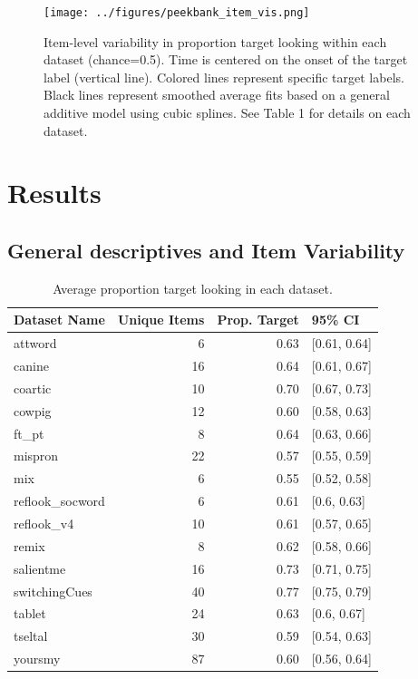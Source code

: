\documentclass[10pt, letterpaper]{article}
\begin{document}
\begin{figure} 
\texttt{[image: ../figures/peekbank\_item\_vis.png]}
\caption{Item-level variability in proportion target looking within each dataset (chance=0.5). Time is centered on the onset of the target label (vertical line). Colored lines represent specific target labels. Black lines represent smoothed average fits based on a general additive model using cubic splines. See Table 1 for details on each dataset.}
\label{fig:peekbank_item_vis}
\end{figure}

\hypertarget{results}{%
\section{Results}\label{results}}

\hypertarget{general-descriptives-and-item-variability}{%
\subsection{General descriptives and Item
Variability}\label{general-descriptives-and-item-variability}}

\begin{table}[H]
\centering
\begingroup\fontsize{9pt}{10pt}\selectfont
\begin{tabular}{lrrl}
  \hline
Dataset Name & Unique Items & Prop. Target & 95\% CI \\ 
  \hline
attword & 6 & 0.63 & [0.61, 0.64] \\ 
  canine & 16 & 0.64 & [0.61, 0.67] \\ 
  coartic & 10 & 0.70 & [0.67, 0.73] \\ 
  cowpig & 12 & 0.60 & [0.58, 0.63] \\ 
  ft\_pt & 8 & 0.64 & [0.63, 0.66] \\ 
  mispron & 22 & 0.57 & [0.55, 0.59] \\ 
  mix & 6 & 0.55 & [0.52, 0.58] \\ 
  reflook\_socword & 6 & 0.61 & [0.6, 0.63] \\ 
  reflook\_v4 & 10 & 0.61 & [0.57, 0.65] \\ 
  remix & 8 & 0.62 & [0.58, 0.66] \\ 
  salientme & 16 & 0.73 & [0.71, 0.75] \\ 
  switchingCues & 40 & 0.77 & [0.75, 0.79] \\ 
  tablet & 24 & 0.63 & [0.6, 0.67] \\ 
  tseltal & 30 & 0.59 & [0.54, 0.63] \\ 
  yoursmy & 87 & 0.60 & [0.56, 0.64] \\ 
   \hline
\end{tabular}
\endgroup
\caption{Average proportion target looking in each dataset.} 
\end{table}
\end{document}
